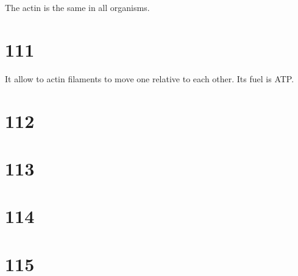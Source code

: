 The actin is the same in all organisms.

\section*{111}

It allow to actin filaments to move one relative to each other. Its fuel is ATP.


\section*{112}



\section*{113}
\section*{114}
\section*{115}


